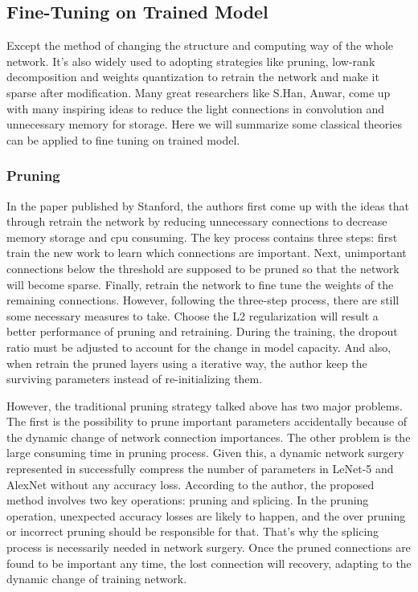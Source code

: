 \documentclass[a4paper]{article}
\begin{document}
\subsection{Fine-Tuning on Trained Model}
\par Except the method of changing the structure and computing way of the whole network. It's also widely used to adopting strategies like pruning, low-rank decomposition and weights quantization to retrain the network and make it sparse after modification. Many great researchers like S.Han, Anwar, come up with many inspiring ideas to reduce the light connections in convolution and unnecessary memory for storage. Here we will summarize some classical theories can be applied to fine tuning on trained model.
\subsubsection{Pruning}
\par In the paper \cite{prunning} published by Stanford, the authors first come up with the ideas that through retrain the network by reducing unnecessary connections to decrease memory storage and cpu consuming. The key process contains three steps: first train the new work to learn which connections are important. Next, unimportant connections below the threshold are supposed to be pruned so that the network will become sparse. Finally, retrain the network to fine tune the weights of the remaining connections. However, following the three-step process, there are still some necessary measures to take. Choose the L2 regularization will result a better performance of pruning and retraining. During the training, the dropout ratio must be adjusted to account for the change in model capacity. And also, when retrain the pruned layers using a iterative way, the author keep the surviving parameters instead of re-initializing them.	
\par However, the traditional pruning\cite{prunning} strategy talked above has two major problems. The first is the possibility to prune important parameters accidentally because of the dynamic change of network connection importances. The other problem is the large consuming time in pruning process. Given this, a dynamic network surgery represented in \cite{dynamic} successfully compress the number of parameters in LeNet-5 and AlexNet without any accuracy loss. According to the author, the proposed method involves two key operations: pruning and splicing. In the pruning operation, unexpected accuracy losses are likely to happen, and the over pruning or incorrect pruning should be responsible for that. That's why the splicing process is necessarily needed in network surgery. Once the pruned connections are found to be important any time, the lost connection will recovery, adapting to the dynamic change of training network. 
\end{document}
